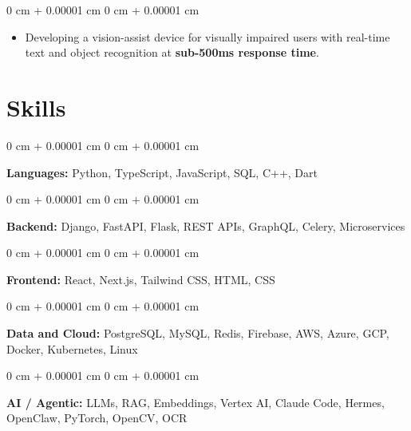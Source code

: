 \documentclass[10pt, letterpaper]{article}
\newenvironment{highlights}{
    \begin{itemize}[
        topsep=0.06 cm,
        parsep=0.06 cm,
        partopsep=0pt,
        itemsep=0pt,
        leftmargin=0 cm + 10pt
    ]
}{
    \end{itemize}
} %
\newenvironment{onecolentry}{
    \begin{adjustwidth}{
        0 cm + 0.00001 cm
    }{
        0 cm + 0.00001 cm
    }
}{
    \end{adjustwidth}
} %
\begin{document}
        \vspace{0.06 cm}
        \begin{onecolentry}
            \begin{highlights}
                \item Developing a vision-assist device for visually impaired users with real-time text and object recognition at \textbf{sub-500ms response time}.
            \end{highlights}
        \end{onecolentry}

    \section{Skills}

        \begin{onecolentry}
            \textbf{Languages:} Python, TypeScript, JavaScript, SQL, C++, Dart
        \end{onecolentry}

        \vspace{0.1 cm}

        \begin{onecolentry}
            \textbf{Backend:} Django, FastAPI, Flask, REST APIs, GraphQL, Celery, Microservices
        \end{onecolentry}

        \vspace{0.1 cm}

        \begin{onecolentry}
            \textbf{Frontend:} React, Next.js, Tailwind CSS, HTML, CSS
        \end{onecolentry}

        \vspace{0.1 cm}

        \begin{onecolentry}
            \textbf{Data and Cloud:} PostgreSQL, MySQL, Redis, Firebase, AWS, Azure, GCP, Docker, Kubernetes, Linux
        \end{onecolentry}

        \vspace{0.1 cm}

        \begin{onecolentry}
            \textbf{AI / Agentic:} LLMs, RAG, Embeddings, Vertex AI, Claude Code, Hermes, OpenClaw, PyTorch, OpenCV, OCR
        \end{onecolentry}

        \vspace{0.1 cm}
\end{document}
